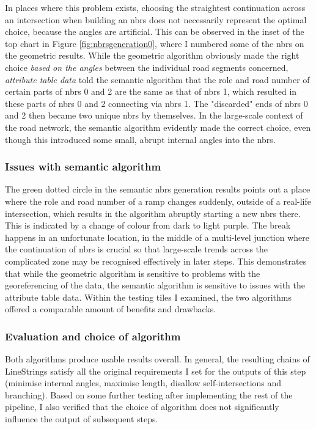 In places where this problem exists, choosing the straightest continuation across an intersection when building an \ac{nbrs} does not necessarily represent the optimal choice, because the angles are artificial. This can be observed in the inset of the top chart in Figure \ref{fig:nbrsgeneration0}, where I numbered some of the \ac{nbrs} on the geometric results. While the geometric algorithm obviously made the right choice \textit{based on the angles} between the individual road segments concerned, \textit{attribute table data} told the semantic algorithm that the role and road number of certain parts of \ac{nbrs} 0 and 2 are the same as that of \ac{nbrs} 1, which resulted in these parts of \ac{nbrs} 0 and 2 connecting via \ac{nbrs} 1. The "discarded" ends of \ac{nbrs} 0 and 2 then became two unique \ac{nbrs} by themselves. In the large-scale context of the road network, the semantic algorithm evidently made the correct choice, even though this introduced some small, abrupt internal angles into the \ac{nbrs}.

\subsubsection{Issues with semantic algorithm}

The green dotted circle in the semantic \ac{nbrs} generation results points out a place where the role and road number of a ramp changes suddenly, outside of a real-life intersection, which results in the algorithm abruptly starting a new \ac{nbrs} there. This is indicated by a change of colour from dark to light purple. The break happens in an unfortunate location, in the middle of a multi-level junction where the continuation of \ac{nbrs} is crucial so that large-scale trends across the complicated zone may be recognised effectively in later steps. This demonstrates that while the geometric algorithm is sensitive to problems with the georeferencing of the data, the semantic algorithm is sensitive to issues with the attribute table data. Within the testing tiles I examined, the two algorithms offered a comparable amount of benefits and drawbacks.

\subsubsection{Evaluation and choice of algorithm}

Both algorithms produce usable results overall. In general, the resulting chains of LineStrings satisfy all the original requirements I set for the outputs of this step (minimise internal angles, maximise length, disallow self-intersections and branching). Based on some further testing after implementing the rest of the pipeline, I also verified that the choice of algorithm does not significantly influence the output of subsequent steps.

